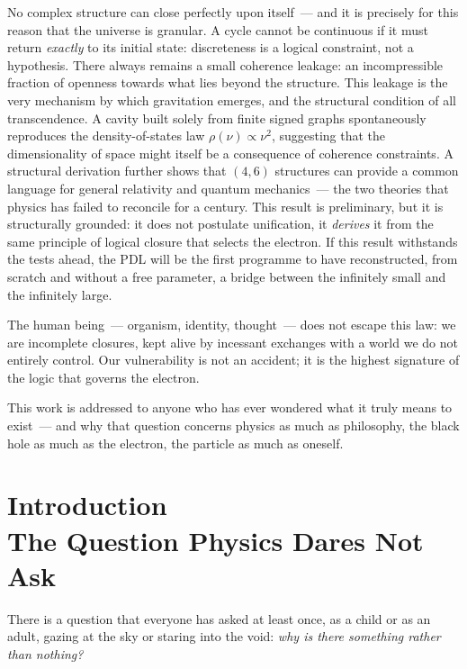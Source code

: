\documentclass[12pt, a4paper, openright]{book}
\begin{document}
No complex structure can close perfectly upon itself~--- and it is precisely for this reason that the universe is granular. A cycle cannot be continuous if it must return \emph{exactly} to its initial state: discreteness is a logical constraint, not a hypothesis. There always remains a small coherence leakage: an incompressible fraction of openness towards what lies beyond the structure. This leakage is the very mechanism by which gravitation emerges, and the structural condition of all transcendence. A cavity built solely from finite signed graphs spontaneously reproduces the density-of-states law $\rho(\nu)\propto\nu^{2}$, suggesting that the dimensionality of space might itself be a consequence of coherence constraints. A structural derivation further shows that $(4,6)$ structures can provide a common language for general relativity and quantum mechanics~--- the two theories that physics has failed to reconcile for a century. This result is preliminary, but it is structurally grounded: it does not postulate unification, it \emph{derives} it from the same principle of logical closure that selects the electron. If this result withstands the tests ahead, the PDL will be the first programme to have reconstructed, from scratch and without a free parameter, a bridge between the infinitely small and the infinitely large.

\medskip

The human being~--- organism, identity, thought~--- does not escape this law: we are incomplete closures, kept alive by incessant exchanges with a world we do not entirely control. Our vulnerability is not an accident; it is the highest signature of the logic that governs the electron.

\medskip

This work is addressed to anyone who has ever wondered what it truly means to exist~--- and why that question concerns physics as much as philosophy, the black hole as much as the electron, the particle as much as oneself.

\newpage

\chapter*{Introduction \\ The Question Physics Dares Not Ask}

There is a question that everyone has asked at least once, as a child or as an adult, gazing at the sky or staring into the void: \emph{why is there something rather than nothing?}
\end{document}

